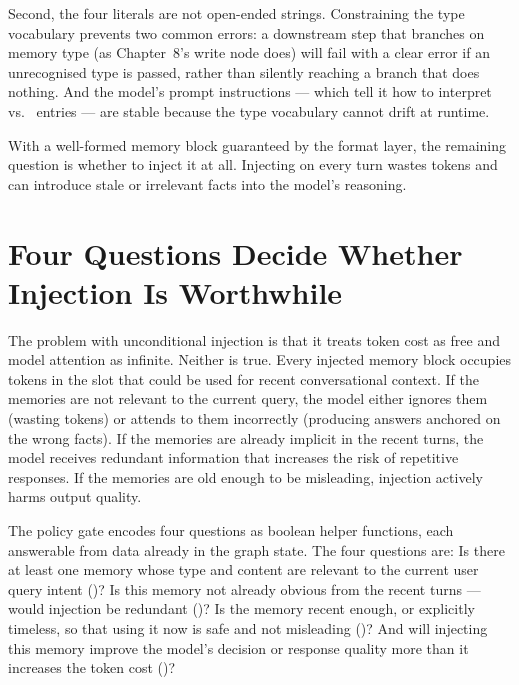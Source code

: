 Second, the four  literals are not open-ended strings.
Constraining the type vocabulary prevents two common errors: a downstream
step that branches on memory type (as Chapter~8's write node does) will
fail with a clear  error if an unrecognised type is passed,
rather than silently reaching a branch that does nothing. And the model's
prompt instructions --- which tell it how to interpret 
vs.\  entries --- are stable because the type vocabulary
cannot drift at runtime.

With a well-formed memory block guaranteed by the format layer, the
remaining question is whether to inject it at all. Injecting on every
turn wastes tokens and can introduce stale or irrelevant facts into the
model's reasoning.

\section{Four Questions Decide Whether Injection Is Worthwhile}
\label{sec:injection-policy}

The problem with unconditional injection is that it treats token cost as
free and model attention as infinite. Neither is true. Every injected
memory block occupies tokens in the  slot that could be
used for recent conversational context. If the memories are not relevant
to the current query, the model either ignores them (wasting tokens) or
attends to them incorrectly (producing answers anchored on the wrong
facts). If the memories are already implicit in the recent turns, the
model receives redundant information that increases the risk of
repetitive responses. If the memories are old enough to be misleading,
injection actively harms output quality.

The policy gate encodes four questions as boolean helper functions,
each answerable from data already in the graph state. The four
questions are: Is there at least one memory whose type and content are
relevant to the current user query intent ()?
Is this memory not already obvious from the recent turns ---
would injection be redundant ()?
Is the memory recent enough, or explicitly timeless, so that using it
now is safe and not misleading ()?
And will injecting this memory improve the model's decision or response
quality more than it increases the token cost
()?

